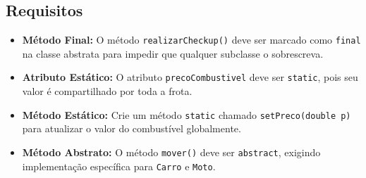 \documentclass[12pt]{article}
\begin{document}
\subsection*{Requisitos}
\begin{itemize}
    \item \textbf{Método Final:} O método \texttt{realizarCheckup()} deve ser marcado como \texttt{final} na classe abstrata para impedir que qualquer subclasse o sobrescreva.
    \item \textbf{Atributo Estático:} O atributo \texttt{precoCombustivel} deve ser \texttt{static}, pois seu valor é compartilhado por toda a frota.
    \item \textbf{Método Estático:} Crie um método \texttt{static} chamado \texttt{setPreco(double p)} para atualizar o valor do combustível globalmente.
    \item \textbf{Método Abstrato:} O método \texttt{mover()} deve ser \texttt{abstract}, exigindo implementação específica para \texttt{Carro} e \texttt{Moto}.
\end{itemize}
\end{document}
